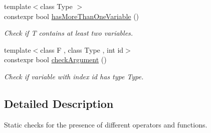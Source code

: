 \begin{DoxyCompactItemize}
{\footnotesize template$<$class Type $>$ }\\constexpr bool \hyperlink{group__Checks_ga5ff379f125d36c212332fd51012195d5}{has\+More\+Than\+One\+Variable} ()
\begin{DoxyCompactList}\small\item\em Check if T contains at least two variables. \end{DoxyCompactList}\item 
{\footnotesize template$<$class F , class Type , int id$>$ }\\constexpr bool \hyperlink{group__Checks_ga31790e5d021a40ac34b7469323c658f9}{check\+Argument} ()
\begin{DoxyCompactList}\small\item\em Check if variable with index id has type Type. \end{DoxyCompactList}\end{DoxyCompactItemize}


\subsection{Detailed Description}
Static checks for the presence of different operators and functions. 